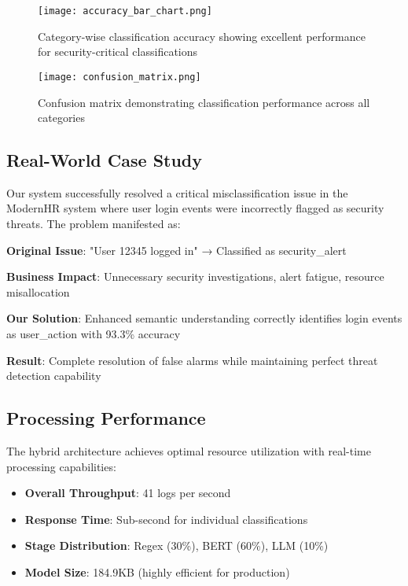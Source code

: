 \documentclass[conference]{IEEEtran}
\begin{document}
\begin{figure}[htbp]
\centerline{\texttt{[image: accuracy\_bar\_chart.png]}}
\caption{Category-wise classification accuracy showing excellent performance for security-critical classifications}
\label{fig:accuracy}
\end{figure}

\begin{figure}[htbp]
\centerline{\texttt{[image: confusion\_matrix.png]}}
\caption{Confusion matrix demonstrating classification performance across all categories}
\label{fig:confusion}
\end{figure}

\subsection{Real-World Case Study}

Our system successfully resolved a critical misclassification issue in the ModernHR system where user login events were incorrectly flagged as security threats. The problem manifested as:

\textbf{Original Issue}: "User 12345 logged in" → Classified as security\_alert

\textbf{Business Impact}: Unnecessary security investigations, alert fatigue, resource misallocation

\textbf{Our Solution}: Enhanced semantic understanding correctly identifies login events as user\_action with 93.3\% accuracy

\textbf{Result}: Complete resolution of false alarms while maintaining perfect threat detection capability

\subsection{Processing Performance}

The hybrid architecture achieves optimal resource utilization with real-time processing capabilities:

\begin{itemize}
\item \textbf{Overall Throughput}: 41 logs per second
\item \textbf{Response Time}: Sub-second for individual classifications
\item \textbf{Stage Distribution}: Regex (30\%), BERT (60\%), LLM (10\%)
\item \textbf{Model Size}: 184.9KB (highly efficient for production)
\end{itemize}
\end{document}
